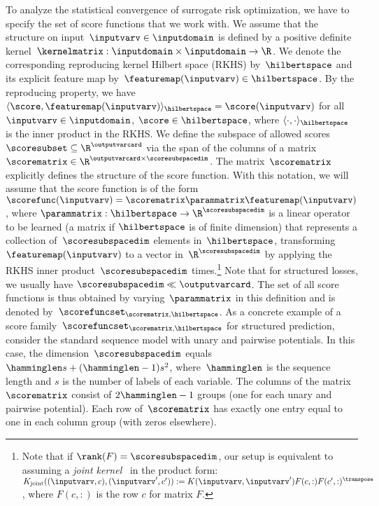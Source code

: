 \documentclass{article}
\begin{document}
To analyze the statistical convergence of surrogate risk optimization, we have to specify the set of score functions that we work with.
We assume that the structure on input~$\inputvarv \in \inputdomain$ is defined by a positive definite kernel~$\kernelmatrix: \inputdomain \times \inputdomain \to \R$.
We denote the corresponding reproducing kernel Hilbert space (RKHS) by~$\hilbertspace$ and its explicit feature map by~$\featuremap(\inputvarv) \in \hilbertspace$. By the reproducing property, we have $\langle\score, \featuremap(\inputvarv) \rangle_{\hilbertspace} = \score(\inputvarv)$ for all $\inputvarv \in \inputdomain$, $\score \in \hilbertspace$, where $\langle\cdot, \cdot \rangle_{\hilbertspace}$ is the inner product in the RKHS.
We define the subspace of allowed scores~$\scoresubset \subseteq \R^\outputvarcard$ via the span of the columns of a matrix $\scorematrix \in \R^{\outputvarcard \times \scoresubspacedim}$.
The matrix~$\scorematrix$ explicitly defines the structure of the score function.
With this notation, we will assume that the score function is of the form $\scorefunc(\inputvarv) = \scorematrix \parammatrix \featuremap(\inputvarv)$, where $\parammatrix: \hilbertspace \to \R^\scoresubspacedim$ is a linear operator to be learned (a matrix if $\hilbertspace$ is of finite dimension) that represents a collection of~$\scoresubspacedim$ elements in~$\hilbertspace$, transforming $\featuremap(\inputvarv)$ to a vector in~$\R^\scoresubspacedim$ by applying the RKHS inner product~$\scoresubspacedim$ times.\footnote{Note that if $\rank(F) =\scoresubspacedim$, our setup is equivalent to assuming a \emph{joint kernel}~\citep{tsochantaridis05} in the product form: $K_{\text{joint}}((\inputvarv,c),(\inputvarv',c')) := K(\inputvarv,\inputvarv') F(c,:) F(c',:)^\transpose$, where $F(c,:)$ is the row $c$ for matrix $F$.}
Note that for structured losses, we usually have $\scoresubspacedim \ll \outputvarcard$.
The set of all score functions is thus obtained by varying~$\parammatrix$ in this definition and is denoted by~$\scorefuncset_{\scorematrix, \hilbertspace}$.
As a concrete example of a score family~$\scorefuncset_{\scorematrix, \hilbertspace}$ for structured prediction, consider the standard sequence model with unary and pairwise potentials.
In this case, the dimension~$\scoresubspacedim$ equals~$\hamminglen s + (\hamminglen-1) s^2$, where~$\hamminglen$ is the sequence length and $s$ is the number of labels of each variable.
The columns of the matrix~$\scorematrix$ consist of $2\hamminglen - 1$ groups (one for each unary and pairwise potential).
Each row of~$\scorematrix$ has exactly one entry equal to one in each column group (with zeros elsewhere).
\end{document}
